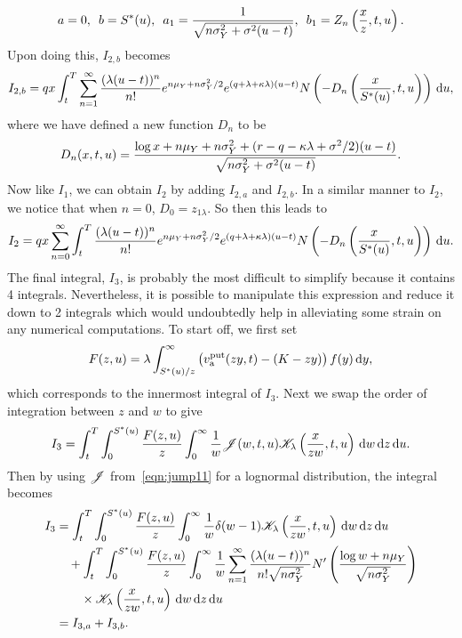			$$
				a = 0, \enskip b = S^*(u), \enskip a_1 = \frac{1}{\sqrt{n\sigma_Y^2 + \sigma^2(u-t)}}, \enskip
			b_1 = Z_n\left( \frac{x}{z}, t, u \right).
			$$
	Upon doing this, $I_{2,b}$ becomes
			$$
				I_{2,b} = qx  \int_t^T  \displaystyle\sum\limits_{n=1}^{\infty} \frac{(\lambda(u-t))^n}{n!} e^{n\mu_Y + n\sigma_Y^2/2} e^{(q+\lambda + \kappa\lambda)(u-t)} N\left( -D_n \left( \frac{x}{S^*(u)},t,u  \right) \right) \, \mathrm d u,
			$$
	where we have defined a new function $D_n$ to be
			\begin{equation}
				\label{eqn:Dn}
				D_n(x,t,u) = \frac{\log x + n\mu_Y + n\sigma_Y^2 + (r-q-\kappa\lambda + \sigma^2/2)(u-t)}{\sqrt{n\sigma_Y^2 + \sigma^2(u-t)}}.
			\end{equation}
	Now like $I_1$, we can obtain $I_2$ by adding $I_{2,a}$ and $I_{2,b}$. In a similar manner to $I_2$, we notice that when $n=0$, $D_0 = z_{1\lambda}$. So then this leads to 
        	\begin{equation}
        		\label{eqn:I2put}
        		I_2 = qx  \displaystyle\sum\limits_{n=0}^{\infty}\int_t^T   \frac{(\lambda(u-t))^n}{n!} e^{n\mu_Y + n\sigma_Y^2/2} e^{(q+\lambda + \kappa\lambda)(u-t)} N\left( -D_n \left( \frac{x}{S^*(u)},t,u  \right) \right) \, \mathrm d u.
        	\end{equation}
	The final integral, $I_3$, is probably the most difficult to simplify because it contains 4 integrals. Nevertheless, it is possible to manipulate this expression and reduce it down to 2 integrals which would undoubtedly help in alleviating some strain on any numerical computations. To start off, we first set
		$$
			F(z,u) = \lambda\int_{S^*(u)/z}^\infty  \left( v_{\text{a}}^{\text{put}}(zy,t) - (K-zy) \right)f(y) \, \mathrm d y,
		$$
	which corresponds to the innermost integral of $I_3$. Next we swap the order of integration between $z$ and $w$ to give
		$$
			I_3 = \int_t^T\int_0^{S^*(u)} \frac{F(z,u)}{z} \int_0^\infty  \frac{1}{w}\mathscr J(w,t,u)\mathscr K_\lambda\left( \frac{x}{zw},t,u \right) \, \mathrm d w \, \mathrm d z \, \mathrm d u. 
		$$
	Then by using $\mathscr J$ from~\eqref{eqn:jump11} for a lognormal distribution, the integral becomes
		\begin{align*}
			I_3 &= \int_t^T\int_0^{S^*(u)} \frac{F(z,u)}{z} \int_0^\infty  \frac{1}{w}\delta(w-1)\mathscr K_\lambda\left( \frac{x}{zw},t,u \right) \, \mathrm d w \, \mathrm d z \, \mathrm d u \\
			& \quad {} + \int_t^T\int_0^{S^*(u)} \frac{F(z,u)}{z} \int_0^\infty  \frac{1}{w}  \displaystyle\sum\limits_{n=1}^{\infty} \frac{(\lambda(u-t))^n}{n!\sqrt{n\sigma_Y^2}} N'\left( \frac{\log w + n\mu_Y}{\sqrt{n\sigma_Y^2}} \right) \\
			&\quad \quad {} \times \mathscr K_\lambda\left( \frac{x}{zw},t,u \right) \, \mathrm d w \, \mathrm d z \, \mathrm d u \\
			&= I_{3,a} + I_{3,b}.
		\end{align*} 
